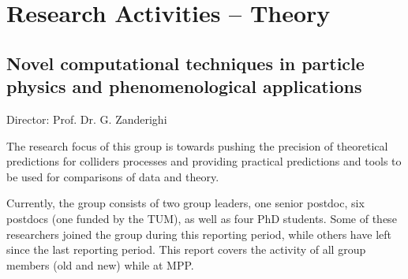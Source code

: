 \documentclass{FBR_Bericht_2025}
\begin{document}
\onecolumn
{}
\tableofcontents
\cleardoublepage

\twocolumn

\chapter{Research Activities -- Theory}
\section[Novel computational techniques in particle physics and phenomenological applications]{Novel computational techniques in particle physics and phenomenological applications}
\begin{Namen}
Director: Prof. Dr. G. Zanderighi
\end{Namen}

The research focus of this group is towards pushing the precision of
theoretical predictions for colliders processes and providing
practical predictions and tools to be used for comparisons of data and
theory.

Currently, the group consists of two group leaders, one senior
postdoc, six postdocs (one funded by the TUM), as well as
four PhD students. Some of these researchers joined the group during this
reporting period, while others have left since the last reporting
period. This report covers the activity of all group members (old and new) while at MPP. 


\end{document}
